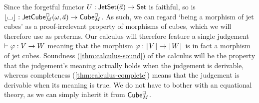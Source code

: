 \documentclass[a4paper]{memoir}
\begin{document}
Since the forgetful functor $U : \mathsf{JetSet}(\vec a) \to {\mathsf{Set}}$ is faithful, so is $\mathopen{}\left\lfloor {\llcorner\hspace{-.4ex}\lrcorner} \right\rfloor\mathclose{} : \mathsf{JetCube}^{\Box}_{M}\mathopen{}\left( \omega,\vec a \right)\mathclose{} \to {\mathsf{Cube}}^\Box_M$.
As such, we can regard `being a morphism of jet cubes' as a proof-irrelevant property of morphisms of cubes, which we will therefore use as preterms.
Our calculus will therefore feature a single judgement $\vdash \varphi : V \to W$ meaning that the morphism $\varphi : \mathopen{}\left\lfloor V \right\rfloor\mathclose{} \to \mathopen{}\left\lfloor W \right\rfloor\mathclose{}$ is in fact a morphism of jet cubes.
Soundness (\cref{thm:calculus-sound}) of the calculus will be the property that the judgement's meaning actually holds when the judgement is derivable, whereas completeness (\cref{thm:calculus-complete}) means that the judgement is derivable when its meaning is true.
We do not have to bother with an equational theory, as we can simply inherit it from ${\mathsf{Cube}}_M^\Box$.
\end{document}
